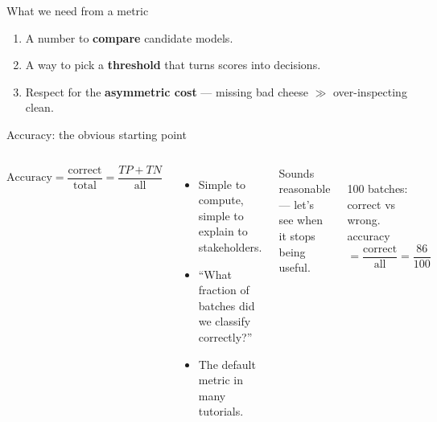 \documentclass[aspectratio=169]{beamer}
\begin{document}
\begin{frame}{What we need from a metric}
  \begin{enumerate}
    \item A number to \textbf{compare} candidate models.
    \item A way to pick a \textbf{threshold} that turns scores into decisions.
    \item Respect for the \textbf{asymmetric cost} --- missing bad cheese $\gg$ over-inspecting clean.
  \end{enumerate}
  \vfill
\end{frame}

\begin{frame}{Accuracy: the obvious starting point}
  \begin{columns}[T]
    \[ \text{Accuracy} = \frac{\text{correct}}{\text{total}} = \frac{TP+TN}{\text{all}} \]
    \begin{itemize}\small
      \item Simple to compute, simple to explain to stakeholders.
      \item ``What fraction of batches did we classify correctly?''
      \item The default metric in many tutorials.
    \end{itemize}
    \vskip 4pt
    \footnotesize Sounds reasonable --- let's see when it stops being useful.
    \begin{center}
      \\[3pt]
      \scriptsize 100 batches: \textcolor{paramgreen!60!black}{correct} vs
      \textcolor{armred}{wrong}.\\ accuracy $=\dfrac{\text{correct}}{\text{all}}=\dfrac{86}{100}$
    \end{center}
  \end{columns}
\end{frame}
\end{document}
